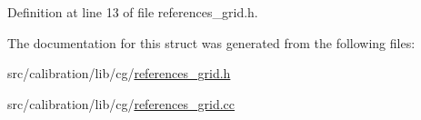 Definition at line 13 of file references\+\_\+grid.\+h.



The documentation for this struct was generated from the following files\+:\begin{DoxyCompactItemize}
\item 
src/calibration/lib/cg/\hyperlink{references__grid_8h}{references\+\_\+grid.\+h}\item 
src/calibration/lib/cg/\hyperlink{references__grid_8cc}{references\+\_\+grid.\+cc}\end{DoxyCompactItemize}
